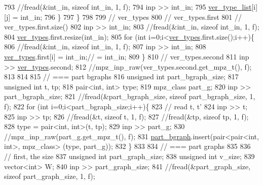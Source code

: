 \begin{DoxyCode}
793       \textcolor{comment}{//fread(&int\_in, sizeof int\_in, 1, f);}
794       inp >> int\_in;
795       \hyperlink{classmarked__graph__compressed_af2e3e55223d436628a02758dfae88493}{ver\_type\_list}[i][j] = int\_in;
796     \}
797   \}
798 
799   \textcolor{comment}{// ver\_types}
800   \textcolor{comment}{// ver\_types.first}
801   \textcolor{comment}{// ver\_types.first.size()}
802   inp >> int\_in;
803   \textcolor{comment}{//fread(&int\_in, sizeof int\_in, 1, f);}
804   \hyperlink{classmarked__graph__compressed_af446cc5e23c241a92b76642fd5ebc403}{ver\_types}.first.resize(int\_in);
805   \textcolor{keywordflow}{for} (\textcolor{keywordtype}{int} i=0;i<\hyperlink{classmarked__graph__compressed_af446cc5e23c241a92b76642fd5ebc403}{ver\_types}.first.size();i++)\{
806     \textcolor{comment}{//fread(&int\_in, sizeof int\_in, 1, f);}
807     inp >> int\_in;
808     \hyperlink{classmarked__graph__compressed_af446cc5e23c241a92b76642fd5ebc403}{ver\_types}.first[i] = int\_in;\textcolor{comment}{// = int\_in;}
809   \}
810   \textcolor{comment}{// ver\_types.second}
811   inp >> \hyperlink{classmarked__graph__compressed_af446cc5e23c241a92b76642fd5ebc403}{ver\_types}.second;
812   \textcolor{comment}{//mpz\_inp\_raw(ver\_types.second.get\_mpz\_t(), f);}
813 
814 
815   \textcolor{comment}{// === part bgraphs}
816   \textcolor{keywordtype}{unsigned} \textcolor{keywordtype}{int} part\_bgraph\_size;
817   \textcolor{keywordtype}{unsigned} \textcolor{keywordtype}{int} t, tp;
818   pair<int, int> type; 
819   mpz\_class part\_g;
820   inp >> part\_bgraph\_size;
821   \textcolor{comment}{//fread(&part\_bgraph\_size, sizeof part\_bgraph\_size, 1, f);}
822   \textcolor{keywordflow}{for} (\textcolor{keywordtype}{int} i=0;i<part\_bgraph\_size;i++)\{
823     \textcolor{comment}{// read t, t'}
824     inp >> t;
825     inp >> tp;
826     \textcolor{comment}{//fread(&t, sizeof t, 1, f);}
827     \textcolor{comment}{//fread(&tp, sizeof tp, 1, f);}
828     type = pair<int, int>(t, tp);
829     inp >> part\_g;
830     \textcolor{comment}{//mpz\_inp\_raw(part\_g.get\_mpz\_t(), f);}
831     \hyperlink{classmarked__graph__compressed_a7b3267063fba30b45eb21b3ba4e07536}{part\_bgraph}.insert(pair<pair<int, int>, mpz\_class> (type, part\_g));
832   \}
833 
834   \textcolor{comment}{// === part graphs}
835 
836   \textcolor{comment}{// first, the size}
837   \textcolor{keywordtype}{unsigned} \textcolor{keywordtype}{int} part\_graph\_size;
838   \textcolor{keywordtype}{unsigned} \textcolor{keywordtype}{int} v\_size;
839   vector<int> W; 
840   inp >> part\_graph\_size;
841   \textcolor{comment}{//fread(&part\_graph\_size, sizeof part\_graph\_size, 1, f);}

\end{DoxyCode}

